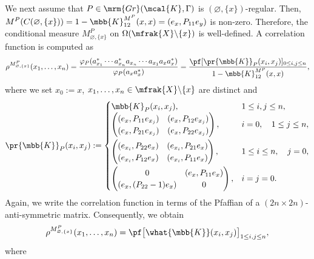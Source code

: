 We next assume that $P\in \mrm{Gr}(\mcal{K},\Gamma)$ is $(\varnothing,\{x\})$-regular. Then, $M^{P}(C(\varnothing,\{x\}))=1-\mbb{K}^{M^{P}}_{12}(x,x)=(e_{x},P_{11}e_{y})$ is non-zero. Therefore, the conditional measure $M^{P}_{\varnothing,\{x\}}$ on $\Omega (\mfrak{X}\backslash\{x\})$ is well-defined. A correlation function is computed as
\begin{gather*}
	\rho^{M^{P}_{\varnothing,\{x\}}}(x_{1},\dots, x_{n}) =\frac{\varphi_{P}(a_{x_{1}}^{\ast}\cdots a_{x_{n}}^{\ast}a_{x_{n}}\cdots a_{x_{1}}a_{x}a^{\ast}_{x})}{\varphi_{P}(a_{x}a^{\ast}_{x})}
	 =\frac{\pf [\pr{\mbb{K}}_{P}(x_{i},x_{j}) ]_{0\le i,j\le n}}{1-\mbb{K}^{M^{P}}_{12}(x,x)},
\end{gather*}
where we set $x_{0}:=x$, $x_{1},\dots, x_{n}\in \mfrak{X}\backslash\{x\}$ are distinct and
\begin{gather*}
	\pr{\mbb{K}}_{P}(x_{i},x_{j}):=
	\begin{cases}
		\mbb{K}_{P}(x_{i},x_{j}), & 1\le i,j\le n, \\
		\left(
		\begin{matrix}
			(e_{x},P_{11}e_{x_{j}}) & (e_{x},P_{12}e_{x_{j}}) \\
			(e_{x}, P_{21}e_{x_{j}}) & (e_{x},P_{22}e_{x_{j}})
		\end{matrix}
		\right), & i=0,\quad 1\le j\le n, \vspace{1mm}\\
		\left(
		\begin{matrix}
			(e_{x_{i}},P_{22}e_{x}) & (e_{x_{i}},P_{21}e_{x}) \\
			(e_{x_{i}}, P_{12}e_{x}) & (e_{x_{i}},P_{11}e_{x})
		\end{matrix}
		\right), & 1\le i \le n,\quad j=0, \vspace{1mm}\\
		\left(
		\begin{matrix}
			0 & (e_{x},P_{11}e_{x}) \\
			(e_{x}, (P_{22}-1)e_{x}) & 0
		\end{matrix}
		\right), & i=j=0.
	\end{cases}
\end{gather*}
Again, we write the correlation function in terms of the Pfaffian of a $(2n\times 2n)$-anti-symmetric matrix. Consequently, we obtain
\begin{equation*}
	\rho^{M^{P}_{\varnothing,\{x\}}}(x_{1},\dots, x_{n})=\pf\big[\what{\mbb{K}}(x_{i},x_{j})\big]_{1\le i,j\le n},
\end{equation*}
where
